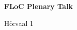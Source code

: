 \documentclass[a4paper]{article}
\begin{document}
\printGenericVSLHeader
\begin{center}
\begin{vsltext}{3cm}{4cm}

   \vspace{0.5cm} 

    \textbf{FLoC Plenary Talk} 

    \vspace{1.5cm}

    Hörsaal 1

\end{vsltext}

\end{center}
\end{document}
